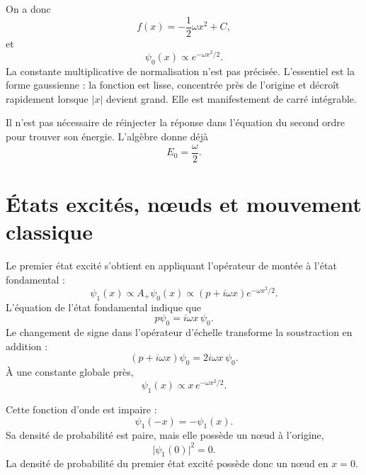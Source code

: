 \begin{classroomqa}
\end{classroomqa}

On a donc
\begin{equation}
f(x)=-\frac12\omega x^{2}+C,
\end{equation}
et
\begin{equation}
\psi_{0}(x)\propto e^{-\omega x^{2}/2}.
\end{equation}
La constante multiplicative de normalisation n’est pas précisée. L’essentiel est la forme gaussienne : la fonction est lisse, concentrée près de l’origine et décroît rapidement lorsque \(\lvert x\rvert\) devient grand. Elle est manifestement de carré intégrable.

Il n’est pas nécessaire de réinjecter la réponse dans l’équation du second ordre pour trouver son énergie. L’algèbre donne déjà
\begin{equation}
E_{0}=\frac{\omega}{2}.
\end{equation}

\section{États excités, nœuds et mouvement classique}

Le premier état excité s’obtient en appliquant l’opérateur de montée à l’état fondamental :
\begin{equation}
\psi_{1}(x)\propto A_{+}\psi_{0}(x)
\propto(p+i\omega x)e^{-\omega x^{2}/2}.
\end{equation}
L’équation de l’état fondamental indique que
\[
p\psi_{0}=i\omega x\,\psi_{0}.
\]
Le changement de signe dans l’opérateur d’échelle transforme la soustraction en addition :
\begin{equation}
(p+i\omega x)\psi_{0}
=2i\omega x\,\psi_{0}.
\end{equation}
À une constante globale près,
\begin{equation}
\psi_{1}(x)\propto x\,e^{-\omega x^{2}/2}.
\end{equation}

Cette fonction d’onde est impaire :
\begin{equation}
\psi_{1}(-x)=-\psi_{1}(x).
\end{equation}
Sa densité de probabilité est paire, mais elle possède un nœud à l’origine,
\begin{equation}
\lvert\psi_{1}(0)\rvert^{2}=0.
\end{equation}
La densité de probabilité du premier état excité possède donc un nœud en \(x=0\).

